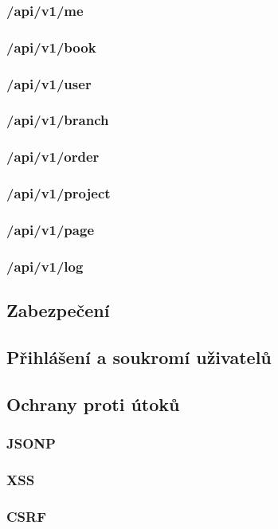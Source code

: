 \documentclass[a4paper,12pt,twoside,BCOR=10mm]{article}
\begin{document}
\subsubsection{/api/v1/me}
\subsubsection{/api/v1/book}
\subsubsection{/api/v1/user}
\subsubsection{/api/v1/branch}
\subsubsection{/api/v1/order}
\subsubsection{/api/v1/project}
\subsubsection{/api/v1/page}
\subsubsection{/api/v1/log}

\subsection{Zabezpečení}
\subsection{Přihlášení a soukromí uživatelů}
\subsection{Ochrany proti útoků}
\subsubsection{JSONP}
\subsubsection{XSS}
\subsubsection{CSRF}
\end{document}

